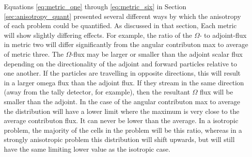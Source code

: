 Equations \eqref{eq:metric_one} through \eqref{eq:metric_six} in
Section \ref{sec:anisotropy_quant} presented several different ways by which the
anisotropy of each problem could be quantified. As discussed in that section,
Each metric will show slightly differing effects. For example, the ratio of the
$\Omega$- to adjoint-flux in metric two will differ significantly from the
angular contributon max to average of metric three. The $\Omega$-flux
may be larger or smaller than the adjoint scalar flux depending on the
directionality of the adjoint and forward particles relative to one another. If
the particles are travelling in opposite directions, this will result in a
larger omega flux than the adjoint flux. If they stream in the same direction
(away from the tally detector, for example),
then the resultant $\Omega$ flux will be smaller than the adjoint. In the case
of the angular contributon max to average the distribution will have a lower
limit where the maximum is very close to the average contributon flux. It can
never be lower than the average. In a isotropic problem, the majority of the
cells in the problem will be this ratio, whereas in a strongly anisotropic
problem this distribution will shift upwards, but will still have the same
limiting lower value as the isotropic case.

